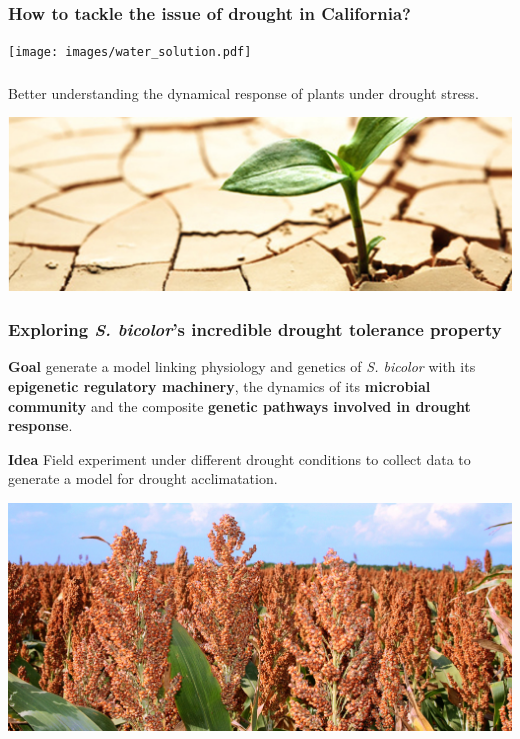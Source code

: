 \documentclass[xcolor=dvipsnames]{beamer}
\begin{document}
\begin{frame}
\frametitle{How to tackle the issue of drought in California?}
\begin{center}
\texttt{[image: images/water\_solution.pdf]}
\end{center}
\end{frame}


\begin{frame}
\frametitle{}
\vspace{7em}
{\Large Better understanding the dynamical response of plants under drought
stress.}

\vspace{3em}
\begin{center}
\hspace*{-1.5em}
\includegraphics[width=1.1\linewidth]{images/plant_drought_stress.jpg}
\end{center}
\end{frame}


\begin{frame}
\frametitle{Exploring \textit{S. bicolor}'s incredible drought tolerance
property}
  

\textbf{\color{Blue} Goal} \quad generate a model linking physiology and
genetics of
  \textit{S. bicolor} with its \textbf{epigenetic regulatory machinery}, the
  dynamics of its \textbf{microbial community} and the composite
\textbf{genetic pathways involved in drought response}.
  
  \vspace{1em}
  \textbf{\color{Blue} Idea} \quad Field experiment under different drought
conditions to
  collect data to generate a model for drought acclimatation.

\begin{center}
\hspace*{-1.5em}
\includegraphics[width=1.1\linewidth]{images/sorghum.jpg}
\end{center}

\end{frame}
  
\end{document}
